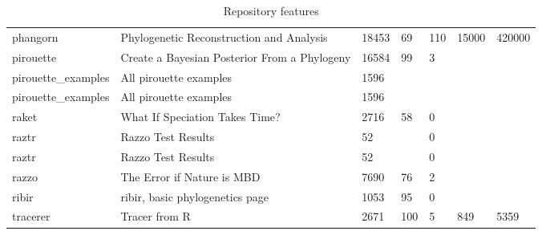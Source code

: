 \begin{table}[ht]
\begin{tabular}{p{}p{}p{}p{}p{}p{}p{}}
  phangorn & Phylogenetic Reconstruction and Analysis & 18453 &  69 & 110 & 15000 & 420000 \\ 
  pirouette & Create a Bayesian Posterior From a Phylogeny & 16584 &  99 &   3 &  &  \\ 
  pirouette\_examples & All pirouette examples & 1596 &  &  &  &  \\ 
  pirouette\_examples & All pirouette examples & 1596 &  &  &  &  \\ 
  raket & What If Speciation Takes Time? & 2716 &  58 &   0 &  &  \\ 
  raztr & Razzo Test Results &  52 &  &   0 &  &  \\ 
  raztr & Razzo Test Results &  52 &  &   0 &  &  \\ 
  razzo & The Error if Nature is MBD & 7690 &  76 &   2 &  &  \\ 
  ribir & ribir, basic phylogenetics page & 1053 &  95 &   0 &  &  \\ 
  tracerer & Tracer from R & 2671 & 100 &   5 & 849 & 5359 \\ 
   \hline
\end{tabular}
\caption{Repository features} 
\label{tab:repos}
\end{table}
